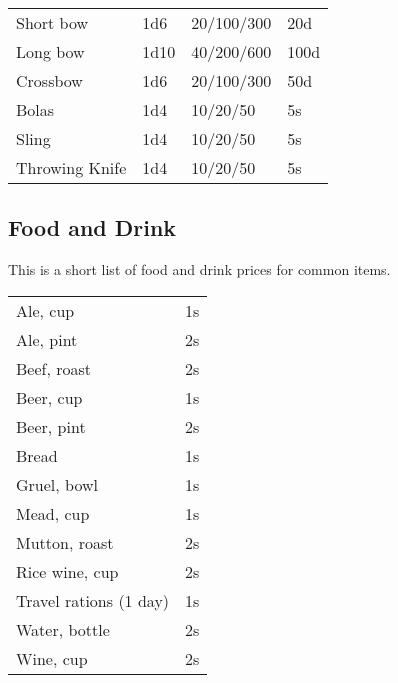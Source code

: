 \begin{center}
{
\begin{xtabular}{|l|l|l|l|}
Short bow & 1d6 & 20/100/300 & 20d \\
Long bow & 1d10 & 40/200/600 & 100d \\
Crossbow & 1d6 & 20/100/300 & 50d \\
Bolas & 1d4 & 10/20/50 & 5s \\
Sling & 1d4 & 10/20/50 & 5s \\
Throwing Knife & 1d4 & 10/20/50 & 5s \\
\hline
\end{xtabular}
}
\end{center}

\subsection{Food and Drink}

This is a short list of food and drink prices for common items.

\begin{center}
{
\begin{xtabular}{|l|l|}
Ale, cup & 1s \\
Ale, pint & 2s \\
Beef, roast & 2s \\
Beer, cup & 1s \\
Beer, pint & 2s \\
Bread & 1s \\
Gruel, bowl & 1s \\
Mead, cup & 1s \\
Mutton, roast & 2s \\
Rice wine, cup & 2s \\
Travel rations (1 day) & 1s \\
Water, bottle & 2s \\
Wine, cup & 2s \\
\hline
\end{xtabular}
}
\end{center}


